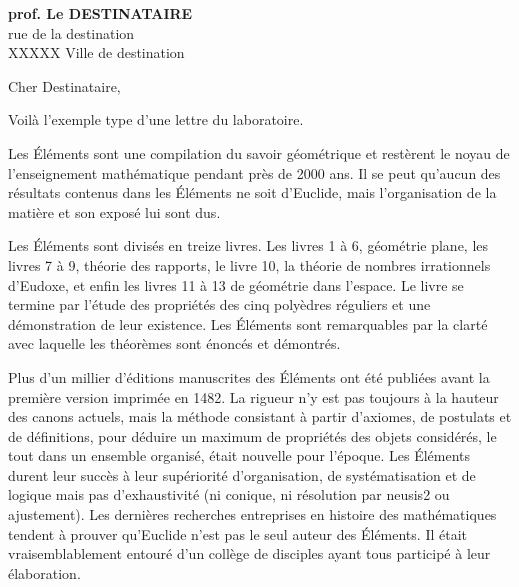 \documentclass[a4paper,11pt]{article}
\begin{document}
\pagestyle{empty}
\laboheader
\labofooter
\begin{destinataire}
\textbf{prof. Le DESTINATAIRE}\\
rue de la destination\\
XXXXX Ville de destination\\
\end{destinataire}


\hspace{4cm}Cher Destinataire,
\vspace{4mm}

{\setlength{\baselineskip}{1.2\baselineskip}
Voil\`a l'exemple type d'une lettre du laboratoire.

Les \'El\'ements sont une compilation du savoir g\'eom\'etrique et rest\`erent le noyau de l'enseignement math\'ematique pendant pr\`es de 2000 ans. Il se peut qu'aucun des r\'esultats contenus dans les \'El\'ements ne soit d'Euclide, mais l'organisation de la mati\`ere et son expos\'e lui sont dus.

Les \'El\'ements sont divis\'es en treize livres. Les livres 1 \`a 6, g\'eom\'etrie plane, les livres 7 \`a 9, th\'eorie des rapports, le livre 10, la th\'eorie de nombres irrationnels d'Eudoxe, et enfin les livres 11 \`a 13 de g\'eom\'etrie dans l'espace. Le livre se termine par l'\'etude des propri\'et\'es des cinq poly\`edres r\'eguliers et une d\'emonstration de leur existence. Les \'El\'ements sont remarquables par la clart\'e avec laquelle les th\'eor\`emes sont \'enonc\'es et d\'emontr\'es.

Plus d'un millier d'\'editions manuscrites des \'El\'ements ont \'et\'e publi\'ees avant la premi\`ere version imprim\'ee en 1482. La rigueur n'y est pas toujours \`a la hauteur des canons actuels, mais la m\'ethode consistant \`a partir d'axiomes, de postulats et de d\'efinitions, pour d\'eduire un maximum de propri\'et\'es des objets consid\'er\'es, le tout dans un ensemble organis\'e, \'etait nouvelle pour l'\'epoque. Les \'El\'ements durent leur succ\`es \`a leur sup\'eriorit\'e d'organisation, de syst\'ematisation et de logique mais pas d'exhaustivit\'e (ni conique, ni r\'esolution par neusis2 ou ajustement). Les derni\`eres recherches entreprises en histoire des math\'ematiques tendent \`a prouver qu'Euclide n'est pas le seul auteur des \'El\'ements. Il \'etait vraisemblablement entour\'e d'un coll\`ege de disciples ayant tous particip\'e \`a leur \'elaboration.
}
\end{document}

